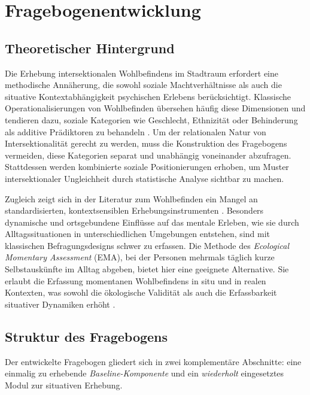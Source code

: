 \section*{Fragebogenentwicklung}

\subsection*{Theoretischer Hintergrund}

Die Erhebung intersektionalen Wohlbefindens im Stadtraum erfordert eine methodische Annäherung, die sowohl soziale Machtverhältnisse als auch die situative Kontextabhängigkeit psychischen Erlebens berücksichtigt. Klassische Operationalisierungen von Wohlbefinden übersehen häufig diese Dimensionen und tendieren dazu, soziale Kategorien wie Geschlecht, Ethnizität oder Behinderung als additive Prädiktoren zu behandeln \parencite{bauerIntersectionalityQuantitativeResearch2021}. Um der relationalen Natur von Intersektionalität gerecht zu werden, muss die Konstruktion des Fragebogens vermeiden, diese Kategorien separat und unabhängig voneinander abzufragen. Stattdessen werden kombinierte soziale Positionierungen erhoben, um Muster intersektionaler Ungleichheit durch statistische Analyse sichtbar zu machen.

Zugleich zeigt sich in der Literatur zum Wohlbefinden ein Mangel an standardisierten, kontextsensiblen Erhebungsinstrumenten \parencite{bautistaWhatWellbeingScoping2023}. Besonders dynamische und ortsgebundene Einflüsse auf das mentale Erleben, wie sie durch Alltagssituationen in unterschiedlichen Umgebungen entstehen, sind mit klassischen Befragungsdesigns schwer zu erfassen. Die Methode des \emph{Ecological Momentary Assessment} (EMA), bei der Personen mehrmals täglich kurze Selbstauskünfte im Alltag abgeben, bietet hier eine geeignete Alternative. Sie erlaubt die Erfassung momentanen Wohlbefindens in situ und in realen Kontexten, was sowohl die ökologische Validität als auch die Erfassbarkeit situativer Dynamiken erhöht \parencite{bakolisUrbanMindUsing2018}.

\subsection*{Struktur des Fragebogens}

Der entwickelte Fragebogen gliedert sich in zwei komplementäre Abschnitte: eine einmalig zu erhebende \emph{Baseline-Komponente} und ein \emph{wiederholt} eingesetztes Modul zur situativen Erhebung.

